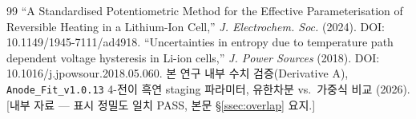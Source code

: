 \documentclass[11pt,a4paper]{article}
\begin{document}
\begin{thebibliography}{99}
 ``A Standardised Potentiometric Method for the Effective Parameterisation of Reversible Heating in a Lithium-Ion Cell,'' \emph{J. Electrochem. Soc.} (2024). DOI: 10.1149/1945-7111/ad4918.
 ``Uncertainties in entropy due to temperature path dependent voltage hysteresis in Li-ion cells,'' \emph{J. Power Sources} (2018). DOI: 10.1016/j.jpowsour.2018.05.060.
 본 연구 내부 수치 검증(Derivative A), \texttt{Anode\_Fit\_v1.0.13} 4-전이 흑연 staging 파라미터, 유한차분 vs.\ 가중식 비교 (2026). [내부 자료 — 표시 정밀도 일치 PASS, 본문 \S\ref{ssec:overlap} 요지.]
\end{thebibliography}
\end{document}
